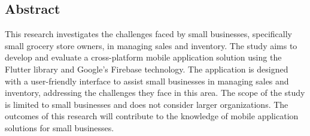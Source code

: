 \documentclass[../thesis.tex]{subfiles}
\begin{document}
\begin{centering}
	\section*{Abstract}
	This research investigates the challenges faced by small businesses, specifically small grocery store owners, in managing sales and inventory. The study aims to develop and evaluate a cross-platform mobile application solution using the Flutter library and Google’s Firebase technology. The application is designed with a user-friendly interface to assist small businesses in managing sales and inventory, addressing the challenges they face in this area. The scope of the study is limited to small businesses and does not consider larger organizations. The outcomes of this research will contribute to the knowledge of mobile application solutions for small businesses.
\end{centering}
\end{document}
